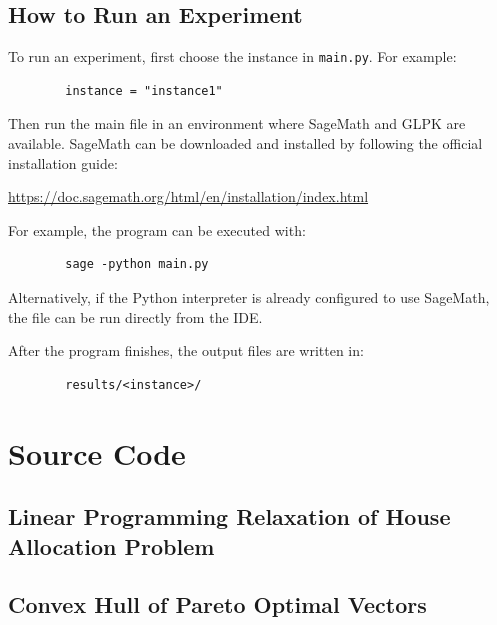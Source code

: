 \documentclass[12pt]{report}
\numberwithin{algorithm}{chapter}
\begin{document}
	\section{How to Run an Experiment}
	
	To run an experiment, first choose the instance in \texttt{main.py}. For example:
	
	\begin{verbatim}
		instance = "instance1"
	\end{verbatim}
	
	Then run the main file in an environment where SageMath and GLPK are available. SageMath can be downloaded and installed by following the official installation guide:
	
	\begin{center}
		\url{https://doc.sagemath.org/html/en/installation/index.html}
	\end{center}
	
	For example, the program can be executed with:
	
	\begin{verbatim}
		sage -python main.py
	\end{verbatim}
	
	Alternatively, if the Python interpreter is already configured to use SageMath, the file can be run directly from the IDE.
	
	After the program finishes, the output files are written in:
	
	\begin{verbatim}
		results/<instance>/
	\end{verbatim}
	
	
\chapter{Source Code}

\section{Linear Programming Relaxation of House Allocation Problem}\label{LP-relaxation-solve}


\section{Convex Hull of Pareto Optimal Vectors}\label{convex-hull-pareto-code}

\end{document}
